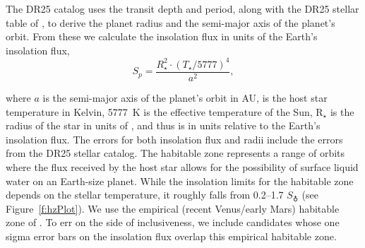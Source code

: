 The DR25 catalog uses the transit depth and period, along with the DR25 stellar table of \citet{Mathur2017ApJS}, to derive the planet radius and the semi-major axis of the planet's orbit.  From these we calculate the insolation flux in units of the Earth's insolation flux,
\vspace{-.3em}
\begin{equation}
S_{p} = \frac{R_{\star}^{2} \cdot (T_{\star}/5777)^{4}}{a^{2}} ,
\end{equation}

\noindent where $a$ is the semi-major axis of the planet's orbit in AU, \tstar{} is the host star temperature in Kelvin, 5777~K is the effective temperature of the Sun, R$_{\star}$ is the radius of the star in units of \rsun, and thus \Splanet{} is in units relative to the Earth's insolation flux. The errors for both insolation flux and radii include the errors from the DR25 stellar catalog. The habitable zone represents a range of orbits where the flux received by the host star allows for the possibility of surface liquid water on an Earth-size planet.  While the insolation limits for the habitable zone depends on the stellar temperature, it roughly falls from 0.2--1.7 $S_{\earth}$ (see Figure~\ref{f:hzPlot}). We use the empirical (recent Venus/early Mars) habitable zone of \citet{Kopparapu2013}.  To err on the side of inclusiveness, we include candidates whose one sigma error bars on the insolation flux overlap this empirical habitable zone.




